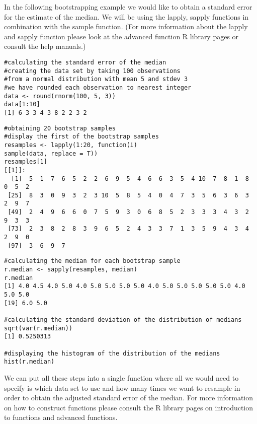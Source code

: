 \documentclass[12pt]{article}
\begin{document}
In the following bootstrapping example we would like to obtain a standard error for the estimate of the median. We will be using the lapply, sapply functions in combination with the sample function. (For more information about the lapply and sapply function please look at the advanced function R library pages or consult the help manuals.)
\begin{framed}
\begin{verbatim}
#calculating the standard error of the median
#creating the data set by taking 100 observations 
#from a normal distribution with mean 5 and stdev 3
#we have rounded each observation to nearest integer
data <- round(rnorm(100, 5, 3))
data[1:10]
[1] 6 3 3 4 3 8 2 2 3 2
\end{verbatim}
\end{framed}
\begin{framed}
\begin{verbatim}
#obtaining 20 bootstrap samples 
#display the first of the bootstrap samples
resamples <- lapply(1:20, function(i)
sample(data, replace = T))
resamples[1]
[[1]]:
  [1]  5  1  7  6  5  2  2  6  9  5  4  6  6  3  5  4 10  7  8  1  8  0  5  2
 [25]  8  3  0  9  3  2  3 10  5  8  5  4  0  4  7  3  5  6  3  6  3  2  9  7
 [49]  2  4  9  6  6  0  7  5  9  3  0  6  8  5  2  3  3  3  4  3  2  9  3  3
 [73]  2  3  8  2  8  3  9  6  5  2  4  3  3  7  1  3  5  9  4  3  4  2  9  0
 [97]  3  6  9  7

\end{verbatim}
\end{framed}  
\begin{framed}
\begin{verbatim}
#calculating the median for each bootstrap sample 
r.median <- sapply(resamples, median)
r.median
[1] 4.0 4.5 4.0 5.0 4.0 5.0 5.0 5.0 5.0 4.0 5.0 5.0 5.0 5.0 5.0 4.0 5.0 5.0
[19] 6.0 5.0

#calculating the standard deviation of the distribution of medians
sqrt(var(r.median))
[1] 0.5250313

#displaying the histogram of the distribution of the medians 
hist(r.median)
\end{verbatim}
\end{framed}  
We can put all these steps into a single function where all we would need to specify is which data set to use and how many times we want to resample in order to obtain the adjusted standard error of the median. For more information on how to construct functions please consult the R library pages on introduction to functions and advanced functions.
\end{document}
